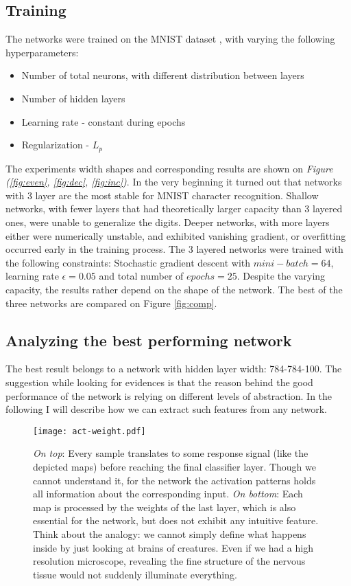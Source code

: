 \subsection{Training}
\label{train}
The networks were trained on the MNIST dataset \cite{mnist}, with varying the following hyperparameters:
\begin{itemize}
    \item Number of total neurons, with different distribution between layers
    \item Number of hidden layers
    \item Learning rate - constant during epochs
    \item Regularization - $L_p$
\end{itemize}

The experiments width shapes and corresponding results are shown on \emph{Figure (\ref{fig:even}, \ref{fig:dec}, \ref{fig:inc})}.
In the very beginning it turned out that networks with 3 layer are the most stable for MNIST character recognition. 
Shallow networks, with fewer layers that had theoretically larger capacity than 3 layered ones, were unable to generalize the digits.
Deeper networks, with more layers either were numerically unstable, and exhibited vanishing gradient, or overfitting occurred early in the training process.
The 3 layered networks were trained with the following constraints: Stochastic gradient descent with $mini-batch=64$, learning rate $\epsilon = 0.05$ and total number of $epochs=25$.
Despite the varying capacity, the results rather depend on the shape of the network. The best of the three networks are compared on Figure \ref{fig:comp}.


\subsection{Analyzing the best performing network}
The best result belongs to a network with hidden layer width: 784-784-100. 
The suggestion while looking for evidences is that the reason behind the good performance of the network is relying on different levels of abstraction.
In the following I will describe how we can extract such features from any network.


\begin{figure}
    \centering
    \texttt{[image: act-weight.pdf]}
    \caption{\emph{On top}: Every sample translates to some response signal (like the depicted maps) before reaching the final classifier layer. 
    Though we cannot understand it, for the network the activation patterns holds all information about the corresponding input.
    \emph{On bottom}: Each map is processed by the weights of the last layer, which is also essential for the network, but does not exhibit any intuitive feature.
    Think about the analogy: we cannot simply define what happens inside by just looking at brains of creatures. 
    Even if we had a high resolution microscope, revealing the fine structure of the nervous tissue would not suddenly illuminate everything.
    }
    \label{fig:act-weight}
\end{figure}



